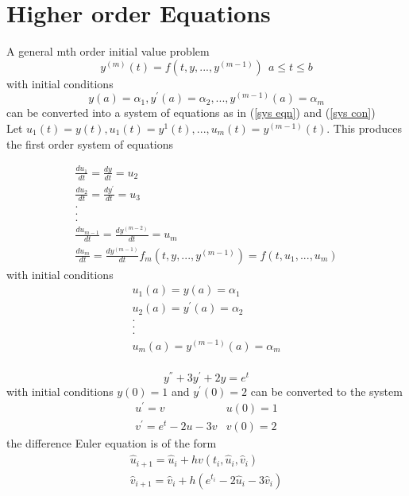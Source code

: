 \section{Higher order Equations}
\begin{definition}
A general mth order initial value problem
\[y^{(m)}(t)=f(t,y,...,y^{(m-1)}) \ \ a\leq t \leq b \]
with initial conditions
\[y(a)=\alpha_1, y^{'}(a)=\alpha_2,...,y^{(m-1)}(a)=\alpha_m \]
can be converted into a system of equations as in (\ref{sys eqn}) and (\ref{sys con})\\
Let $u_1(t)=y(t), u_1(t)=y^{1}(t),...,u_m(t)=y^{(m-1)}(t) $. This produces
the first order system of equations

\[
\begin{array}{cl}
\frac{du_1}{dt}=\frac{dy}{dt}=u_2\\
\frac{du_2}{dt}=\frac{dy^{'}}{dt}=u_3\\
.\\
.\\
.\\
\frac{du_{m-1}}{dt}=\frac{dy^{(m-2)}}{dt}=u_m\\
\frac{du_m}{dt}=\frac{dy^{(m-1)}}{dt}f_m(t,y,...,y^{(m-1)})=f(t,u_1,...,u_m)
\end{array}
\]
with initial conditions
\[
\begin{array}{cl}
u_{1}(a)=y(a)=\alpha_1\\
u_{2}(a)=y^{'}(a)=\alpha_2\\
.\\
.\\
.\\
u_{m}(a)=y^{(m-1)}(a)=\alpha_m\\
\end{array}
\]
\end{definition}
\begin{example}
\[ y^{''}+3y^{'}+2y=e^t\]
with initial conditions $y(0)=1$ and $y^{'}(0)=2$ can be converted to the system
\[
\begin{array}{cl}
u^{'}=v &u(0)=1\\
v^{'}=e^t-2u-3v &v(0)=2
\end{array}
\]
the difference Euler equation is of the form
\[
\begin{array}{cl}
\hat{u}_{i+1}=\hat{u}_i+hv(t_i,\hat{u}_i,\hat{v}_i)\\
\hat{v}_{i+1}=\hat{v}_i+h(e^{t_i}-2\hat{u}_i-3\hat{v}_i)\\
\end{array}
\]
\end{example}
